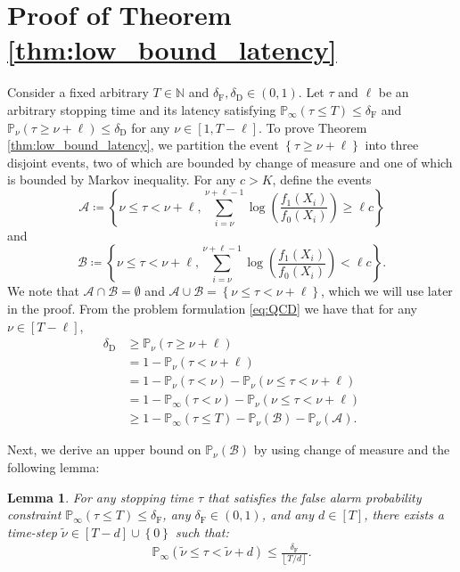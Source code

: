 \documentclass[12pt]{interact}
\newcommand{\tilnu}{\tilde{\nu}}
\newcommand{\lp}{\left(}
\newcommand{\rp}{\right)}
\newcommand{\lb}{\left[}
\newcommand{\rb}{\right]}
\newcommand{\lbp}{\left\{}
\newcommand{\rbp}{\right\}}
\newcommand{\mcal}{\mathcal}
\newcommand{\mrm}{\mathrm}
\newcommand{\mbb}{\mathbb}
\newcommand{\lfl}{\left\lfloor}
\newcommand{\rfl}{\right\rfloor}
\renewcommand{\Pr}{\mathbb{P}}
\theoremstyle{plain}
\newtheorem{lemma}{Lemma}
\begin{document}
\section{Proof of Theorem \ref{thm:low_bound_latency}} \label{sec:thm1}

Consider a fixed arbitrary $T \in \mbb{N}$ and  $\delta_{\mrm{F}}, \delta_{\mrm{D}} \in \lp 0, 1 \rp$. Let $\tau$ and $\ell$ be an arbitrary stopping time and its latency satisfying $\Pr_{\infty}\lp \tau \leq T \rp \leq \delta_{\mrm{F}}$ and $\Pr_{\nu}\lp \tau \geq \nu+\ell \rp \leq \delta_{\mrm{D}}$ for any $\nu \in \lb 1, T-\ell\rb$. To prove Theorem \ref{thm:low_bound_latency}, we partition the event $\lbp \tau\geq\nu+\ell \rbp$ into three disjoint events, two of which are bounded by change of measure and one of which is bounded by Markov inequality. For any $c > K$, define the events
%
\begin{equation}
\mcal{A}\coloneqq\lbp\nu\leq\tau<\nu+\ell,\sum_{i=\nu}^{\nu+\ell-1}\!\!\log\lp\frac{f_{1}\lp X_{i}\rp}{f_{0}\lp X_{i}\rp}\rp\geq \ell c\rbp
\end{equation}
%
and 
%
\begin{equation}\label{eq:Bc}
\mcal{B}\coloneqq\lbp\nu\leq\tau<\nu+\ell,\sum_{i=\nu}^{\nu+\ell-1}\!\!\log\lp\frac{f_{1}\lp X_{i}\rp}{f_{0}\lp X_{i}\rp}\rp<\ell c\rbp.
\end{equation}
%
We note that $\mcal{A}\cap \mcal{B} = \emptyset$ and $\mcal{A}\cup \mcal{B}= \lbp \nu\leq \tau < \nu+\ell \rbp$, which we will use later in the proof. From the problem formulation \eqref{eq:QCD} we have that for any $\nu\in\lb T-\ell \rb$, 
%
\begin{align}
\delta_{\mathrm{D}}
&\geq\Pr_{\nu}\lp\tau\geq\nu+\ell\rp\nonumber\\
&=1-\Pr_{\nu}\lp\tau<\nu+\ell\rp \nonumber\\
&=1-\Pr_{\nu}\lp\tau<\nu\rp-\Pr_{\nu}\lp\nu\leq\tau<\nu+\ell\rp \nonumber\\
&=1-\Pr_{\infty}\lp\tau<\nu\rp-\Pr_{\nu}\lp\nu\leq\tau<\nu+\ell\rp \nonumber\\
&\geq1-\Pr_{\infty}\lp\tau\leq T\rp-\Pr_{\nu}\lp\mcal{B}\rp-\Pr_{\nu}\lp\mcal{A}\rp.\label{eq:thm_1_sketch_1}
\end{align}

Next, we derive an upper bound on $\Pr_{\nu}\lp\mcal{B}\rp$ by using change of measure and the following lemma:

\begin{lemma}\label{lem:LowBoundFA} For any stopping time $\tau$ that satisfies the false alarm probability constraint $\Pr_{\infty} \lp \tau \leq T \rp \leq \delta_{\mrm{F}}$, any $\delta_{\mathrm{F}}\in\lp0,1\rp$, and any $d\in\lb T\rb$, there exists a time-step $\tilnu\in\lb T-d\rb\cup\lbp 0\rbp$ such that:
%
\begin{align}
\Pr_{\infty}\lp\tilnu\leq\tau< \tilnu+d\rp\leq\frac{\delta_{\mathrm{F}}}{\lfl T/d\rfl}.\label{eq:FA_window}
\end{align}
%
\end{lemma}
\end{document}
